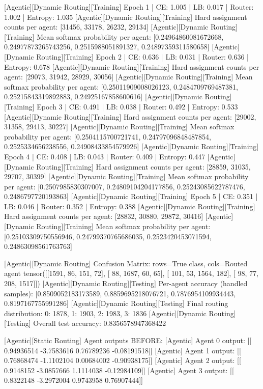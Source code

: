 [Agentic][Dynamic Routing][Training] Epoch 1 | CE: 1.005 | LB: 0.017 | Router: 1.002 | Entropy: 1.035
[Agentic][Dynamic Routing][Training] Hard assignment counts per agent: [31456, 33178, 26232, 29134]
[Agentic][Dynamic Routing][Training] Mean softmax probability per agent: [0.24964860081672668, 0.24977873265743256, 0.2515988051891327, 0.24897359311580658]
[Agentic][Dynamic Routing][Training] Epoch 2 | CE: 0.636 | LB: 0.031 | Router: 0.636 | Entropy: 0.678
[Agentic][Dynamic Routing][Training] Hard assignment counts per agent: [29073, 31942, 28929, 30056]
[Agentic][Dynamic Routing][Training] Mean softmax probability per agent: [0.25011909008026123, 0.2484709769487381, 0.25215843319892883, 0.24925167858600616]
[Agentic][Dynamic Routing][Training] Epoch 3 | CE: 0.491 | LB: 0.038 | Router: 0.492 | Entropy: 0.533
[Agentic][Dynamic Routing][Training] Hard assignment counts per agent: [29002, 31358, 29413, 30227]
[Agentic][Dynamic Routing][Training] Mean softmax probability per agent: [0.2504115700721741, 0.24797096848487854, 0.2525334656238556, 0.24908433854579926]
[Agentic][Dynamic Routing][Training] Epoch 4 | CE: 0.408 | LB: 0.043 | Router: 0.409 | Entropy: 0.447
[Agentic][Dynamic Routing][Training] Hard assignment counts per agent: [28859, 31035, 29707, 30399]
[Agentic][Dynamic Routing][Training] Mean softmax probability per agent: [0.2507985830307007, 0.24809104204177856, 0.25243085622787476, 0.2486797720193863]
[Agentic][Dynamic Routing][Training] Epoch 5 | CE: 0.351 | LB: 0.046 | Router: 0.352 | Entropy: 0.388
[Agentic][Dynamic Routing][Training] Hard assignment counts per agent: [28832, 30880, 29872, 30416]
[Agentic][Dynamic Routing][Training] Mean softmax probability per agent: [0.25103309750556946, 0.24799370765686035, 0.2523420453071594, 0.24863098561763763]

[Agentic][Dynamic Routing] Confusion Matrix: rows=True class, cols=Routed agent
tensor([[1591,   86,  151,   72],
[  88, 1687,   60,   65],
[ 101,   53, 1564,  182],
[  98,   77,  208, 1517]])
[Agentic][Dynamic Routing][Testing] Per-agent accuracy (handled samples): [0.8509052183173589, 0.8859695218076721, 0.7876954109934443, 0.8197167755991286]
[Agentic][Dynamic Routing][Testing] Final routing distribution: {0: 1878, 1: 1903, 2: 1983, 3: 1836}
[Agentic][Dynamic Routing][Testing] Overall test accuracy: 0.8356578947368422

[Agentic][Static Routing] Agent outputs BEFORE:
[Agentic] Agent 0 output: [[ 0.94936514 -3.7583616   0.76789236 -0.08191518]]
[Agentic] Agent 1 output: [[ 0.76868474 -1.1102104   0.00684002 -0.90938175]]
[Agentic] Agent 2 output: [[ 0.9148152  -3.0857666   1.1114038  -0.12984109]]
[Agentic] Agent 3 output: [[ 0.8322148  -3.2972004   0.9743958   0.76907444]]

